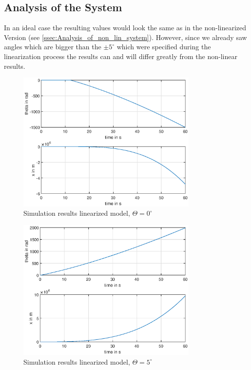 \subsection{Analysis of the System}
In an ideal case the resulting values would look the same as in the non-linearized Version (see \autoref{ssec:Analysis_of_non_lin_system}). However, since we already saw angles which are bigger than the $\pm 5^\circ$ which were specified during the linearization process the results can and will differ greatly from the non-linear results.
\begin{figure}[H]
    \centering
    \includegraphics[width=0.8\textwidth]{Lab_report/pics/plots/linearized_results_theta_0.eps}
    \caption{Simulation results linearized model, $\Theta=0^\circ$}
    \label{fig:sim_res_non_lin_t_5}
\end{figure}
\begin{figure}[H]
    \centering
    \includegraphics[width=0.8\textwidth]{Lab_report/pics/plots/linearized_results_theta_5.eps}
    \caption{Simulation results linearized model, $\Theta=5^\circ$}
    \label{fig:sim_res_non_lin_t_5}
\end{figure}
